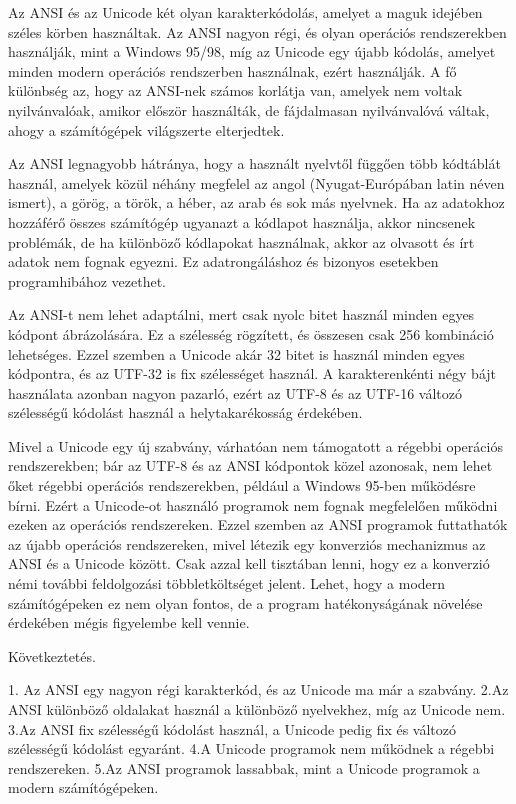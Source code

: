 \documentclass[tocnopagenum]{thesis-ekf}
\theoremstyle{definition}
\theoremstyle{remark}
\begin{document}
		Az ANSI és az Unicode két olyan karakterkódolás, amelyet a maguk idejében széles körben használtak. Az ANSI nagyon régi, és olyan operációs rendszerekben használják, mint a Windows 95/98, míg az Unicode egy újabb kódolás, amelyet minden modern operációs rendszerben használnak, ezért használják. A fő különbség az, hogy az ANSI-nek számos korlátja van, amelyek nem voltak nyilvánvalóak, amikor először használták, de fájdalmasan nyilvánvalóvá váltak, ahogy a számítógépek világszerte elterjedtek.
		
		Az ANSI legnagyobb hátránya, hogy a használt nyelvtől függően több kódtáblát használ, amelyek közül néhány megfelel az angol (Nyugat-Európában latin néven ismert), a görög, a török, a héber, az arab és sok más nyelvnek. Ha az adatokhoz hozzáférő összes számítógép ugyanazt a kódlapot használja, akkor nincsenek problémák, de ha különböző kódlapokat használnak, akkor az olvasott és írt adatok nem fognak egyezni. Ez adatrongáláshoz és bizonyos esetekben programhibához vezethet.
		
		Az ANSI-t nem lehet adaptálni, mert csak nyolc bitet használ minden egyes kódpont ábrázolására. Ez a szélesség rögzített, és összesen csak 256 kombináció lehetséges. Ezzel szemben a Unicode akár 32 bitet is használ minden egyes kódpontra, és az UTF-32 is fix szélességet használ. A karakterenkénti négy bájt használata azonban nagyon pazarló, ezért az UTF-8 és az UTF-16 változó szélességű kódolást használ a helytakarékosság érdekében.
		
		Mivel a Unicode egy új szabvány, várhatóan nem támogatott a régebbi operációs rendszerekben; bár az UTF-8 és az ANSI kódpontok közel azonosak, nem lehet őket régebbi operációs rendszerekben, például a Windows 95-ben működésre bírni. Ezért a Unicode-ot használó programok nem fognak megfelelően működni ezeken az operációs rendszereken. Ezzel szemben az ANSI programok futtathatók az újabb operációs rendszereken, mivel létezik egy konverziós mechanizmus az ANSI és a Unicode között. Csak azzal kell tisztában lenni, hogy ez a konverzió némi további feldolgozási többletköltséget jelent. Lehet, hogy a modern számítógépeken ez nem olyan fontos, de a program hatékonyságának növelése érdekében mégis figyelembe kell vennie.
		
		Következtetés.
		
		1. Az ANSI egy nagyon régi karakterkód, és az Unicode ma már a szabvány.
		2.Az ANSI különböző oldalakat használ a különböző nyelvekhez, míg az Unicode nem.
		3.Az ANSI fix szélességű kódolást használ, a Unicode pedig fix és változó szélességű kódolást egyaránt.
		4.A Unicode programok nem működnek a régebbi rendszereken.
		5.Az ANSI programok lassabbak, mint a Unicode programok a modern számítógépeken. \cite{ansi_unicode}
		
\end{document}
